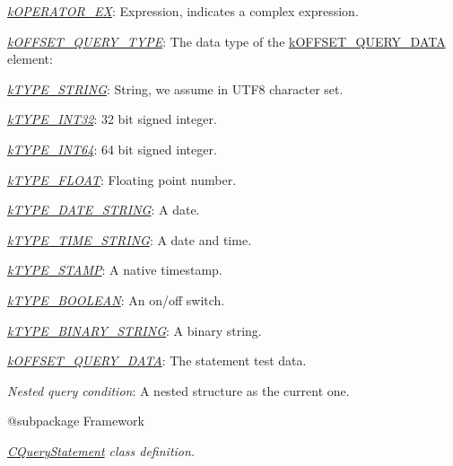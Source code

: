 {\begin{DoxyItemize}
\begin{DoxyItemize}
\begin{DoxyItemize}
\begin{DoxyItemize}
\item {\itshape \hyperlink{}{k\-O\-P\-E\-R\-A\-T\-O\-R\-\_\-\-E\-X}}\-: Expression, indicates a complex expression. 
\end{DoxyItemize}
\item {\itshape \hyperlink{}{k\-O\-F\-F\-S\-E\-T\-\_\-\-Q\-U\-E\-R\-Y\-\_\-\-T\-Y\-P\-E}}\-: The data type of the \hyperlink{}{k\-O\-F\-F\-S\-E\-T\-\_\-\-Q\-U\-E\-R\-Y\-\_\-\-D\-A\-T\-A} element\-: 
\begin{DoxyItemize}
\item {\itshape \hyperlink{}{k\-T\-Y\-P\-E\-\_\-\-S\-T\-R\-I\-N\-G}}\-: String, we assume in U\-T\-F8 character set. 
\item {\itshape \hyperlink{}{k\-T\-Y\-P\-E\-\_\-\-I\-N\-T32}}\-: 32 bit signed integer. 
\item {\itshape \hyperlink{}{k\-T\-Y\-P\-E\-\_\-\-I\-N\-T64}}\-: 64 bit signed integer. 
\item {\itshape \hyperlink{}{k\-T\-Y\-P\-E\-\_\-\-F\-L\-O\-A\-T}}\-: Floating point number. 
\item {\itshape \hyperlink{}{k\-T\-Y\-P\-E\-\_\-\-D\-A\-T\-E\-\_\-\-S\-T\-R\-I\-N\-G}}\-: A date. 
\item {\itshape \hyperlink{}{k\-T\-Y\-P\-E\-\_\-\-T\-I\-M\-E\-\_\-\-S\-T\-R\-I\-N\-G}}\-: A date and time. 
\item {\itshape \hyperlink{}{k\-T\-Y\-P\-E\-\_\-\-S\-T\-A\-M\-P}}\-: A native timestamp. 
\item {\itshape \hyperlink{}{k\-T\-Y\-P\-E\-\_\-\-B\-O\-O\-L\-E\-A\-N}}\-: An {\ttfamily on}/{\ttfamily off} switch. 
\item {\itshape \hyperlink{}{k\-T\-Y\-P\-E\-\_\-\-B\-I\-N\-A\-R\-Y\-\_\-\-S\-T\-R\-I\-N\-G}}\-: A binary string. 
\end{DoxyItemize}
\item {\itshape \hyperlink{}{k\-O\-F\-F\-S\-E\-T\-\_\-\-Q\-U\-E\-R\-Y\-\_\-\-D\-A\-T\-A}}\-: The statement test data. 
\end{DoxyItemize}
\item {\itshape Nested query condition}\-: A nested structure as the current one. 
\end{DoxyItemize}
\end{DoxyItemize}}

{\itshape \begin{DoxyVerb} @subpackage        Framework\end{DoxyVerb}
}

{\itshape {\itshape \hyperlink{class_c_query_statement}{C\-Query\-Statement}} class definition.}

